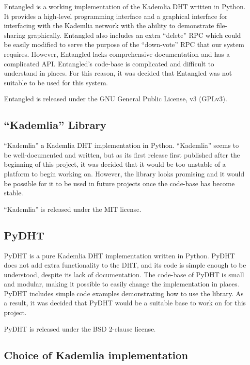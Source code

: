 Entangled is a working implementation of the Kademlia DHT written in Python. It provides a high-level programming interface and
a graphical interface for interfacing with the Kademlia network with the ability to demonstrate file-sharing graphically.
Entangled also includes an extra ``delete'' RPC which could be easily modified to serve the purpose of the ``down-vote'' RPC
that our system requires. However, Entangled lacks comprehensive documentation and has a complicated API.
Entangled's code-base is complicated and difficult to understand in places. For this reason, it was decided that Entangled
was not suitable to be used for this system.

Entangled is released under the GNU General Public License, v3 (GPLv3).

\subsection{``Kademlia'' Library}

``Kademlia'' a Kademlia DHT implementation in Python. ``Kademlia'' seems to be well-documented and written,
but as its first release first published after the beginning of this project, it was decided that it would be too unstable of
a platform to begin working on. However, the library looks promising and it would be possible for it to be used in future projects
once the code-base has become stable.

``Kademlia'' is released under the MIT license.

\subsection{PyDHT}

PyDHT is a pure Kademlia DHT implementation written in Python. PyDHT does not add extra functionality to the DHT, and its code
is simple enough to be understood, despite its lack of documentation. The code-base of PyDHT is small and modular, making
it possible to easily change the implementation in places. PyDHT includes simple code examples demonstrating how to use the
library. As a result, it was decided that PyDHT would be a suitable base to work on for this project.

PyDHT is released under the BSD 2-clause license.

\subsection{Choice of Kademlia implementation}

